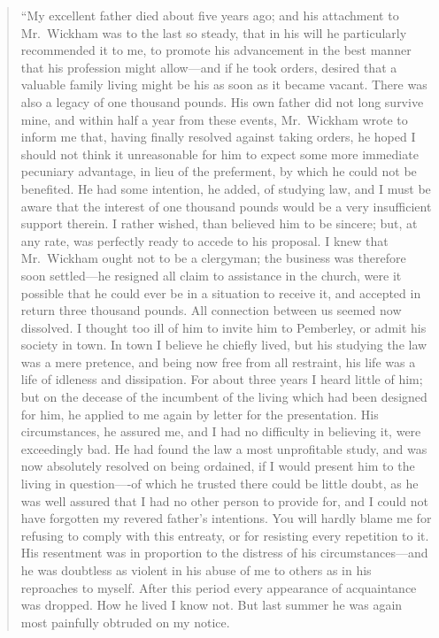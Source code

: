 \documentclass[12pt,english]{book}
\begin{document}
\begin{quotation}
{}``My excellent father died about five years ago; and his attachment
to Mr.\ Wickham was to the last so steady, that in his will he particularly
recommended it to me, to promote his advancement in the best manner
that his profession might allow\mbox{---}and if he took orders, desired
that a valuable family living might be his as soon as it became vacant.
There was also a legacy of one thousand pounds. His own father did
not long survive mine, and within half a year from these events, Mr.\ Wickham
wrote to inform me that, having finally resolved against taking orders,
he hoped I should not think it unreasonable for him to expect some
more immediate pecuniary advantage, in lieu of the preferment, by
which he could not be benefited. He had some intention, he added,
of studying law, and I must be aware that the interest of one thousand
pounds would be a very insufficient support therein. I rather wished,
than believed him to be sincere; but, at any rate, was perfectly ready
to accede to his proposal. I knew that Mr.\ Wickham ought not to
be a clergyman; the business was therefore soon settled\mbox{---}he
resigned all claim to assistance in the church, were it possible that
he could ever be in a situation to receive it, and accepted in return
three thousand pounds. All connection between us seemed now dissolved.
I thought too ill of him to invite him to Pemberley, or admit his
society in town. In town I believe he chiefly lived, but his studying
the law was a mere pretence, and being now free from all restraint,
his life was a life of idleness and dissipation. For about three years
I heard little of him; but on the decease of the incumbent of the
living which had been designed for him, he applied to me again by
letter for the presentation. His circumstances, he assured me, and
I had no difficulty in believing it, were exceedingly bad. He had
found the law a most unprofitable study, and was now absolutely resolved
on being ordained, if I would present him to the living in question\mbox{---}-of
which he trusted there could be little doubt, as he was well assured
that I had no other person to provide for, and I could not have forgotten
my revered father's intentions. You will hardly blame me for refusing
to comply with this entreaty, or for resisting every repetition to
it. His resentment was in proportion to the distress of his circumstances\mbox{---}and
he was doubtless as violent in his abuse of me to others as in his
reproaches to myself. After this period every appearance of acquaintance
was dropped. How he lived I know not. But last summer he was again
most painfully obtruded on my notice.


\end{quotation}
\end{document}
